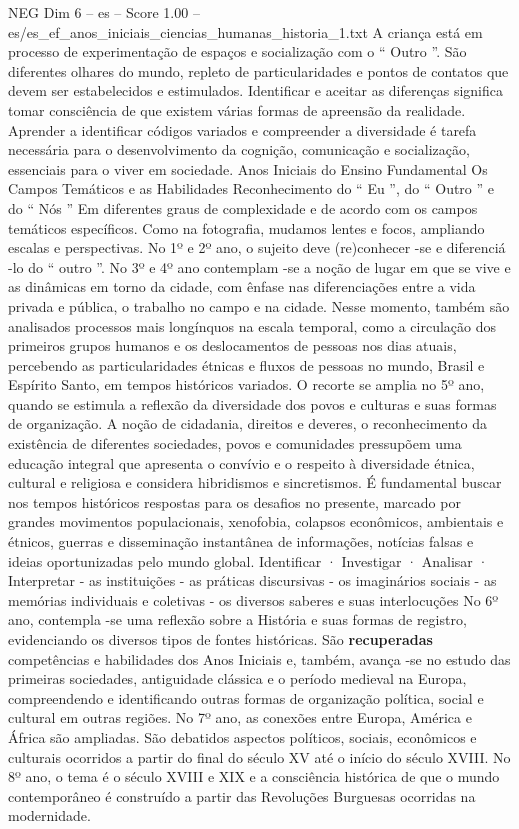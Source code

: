 \begin{textsample}{NEG Dim 6 – es – Score 1.00 – es/es\_ef\_anos\_iniciais\_ciencias\_humanas\_historia\_1.txt}
A criança está em processo de experimentação de espaços e socialização com o “ Outro ”.
São diferentes olhares do mundo, repleto de particularidades e pontos de contatos que devem ser estabelecidos e estimulados.
Identificar e aceitar as diferenças significa tomar consciência de que existem várias formas de apreensão da realidade.
Aprender a identificar códigos variados e compreender a diversidade é tarefa necessária para o desenvolvimento da cognição, comunicação e socialização, essenciais para o viver em sociedade.
Anos Iniciais do Ensino Fundamental Os Campos Temáticos e as Habilidades Reconhecimento do “ Eu ”, do “ Outro ” e do “ Nós ” Em diferentes graus de complexidade e de acordo com os campos temáticos específicos.
Como na fotografia, mudamos lentes e focos, ampliando escalas e perspectivas.
No 1º e 2º ano, o sujeito deve (re)conhecer -se e diferenciá -lo do “ outro ”.
No 3º e 4º ano contemplam -se a noção de lugar em que se vive e as dinâmicas em torno da cidade, com ênfase nas diferenciações entre a vida privada e pública, o trabalho no campo e na cidade.
Nesse momento, também são analisados processos mais longínquos na escala temporal, como a circulação dos primeiros grupos humanos e os deslocamentos de pessoas nos dias atuais, percebendo as particularidades étnicas e fluxos de pessoas no mundo, Brasil e Espírito Santo, em tempos históricos variados.
O recorte se amplia no 5º ano, quando se estimula a reflexão da diversidade dos povos e culturas e suas formas de organização.
A noção de cidadania, direitos e deveres, o reconhecimento da existência de diferentes sociedades, povos e comunidades pressupõem uma educação integral que apresenta o convívio e o respeito à diversidade étnica, cultural e religiosa e considera hibridismos e sincretismos.
É fundamental buscar nos tempos históricos respostas para os desafios no presente, marcado por grandes movimentos populacionais, xenofobia, colapsos econômicos, ambientais e étnicos, guerras e disseminação instantânea de informações, notícias falsas e ideias oportunizadas pelo mundo global.
Identificar · Investigar · Analisar · Interpretar - as instituições - as práticas discursivas - os imaginários sociais - as memórias individuais e coletivas - os diversos saberes e suas interlocuções No 6º ano, contempla -se uma reflexão sobre a História e suas formas de registro, evidenciando os diversos tipos de fontes históricas.
São \textbf{recuperadas} competências e habilidades dos Anos Iniciais e, também, avança -se no estudo das primeiras sociedades, antiguidade clássica e o período medieval na Europa, compreendendo e identificando outras formas de organização política, social e cultural em outras regiões.
No 7º ano, as conexões entre Europa, América e África são ampliadas.
São debatidos aspectos políticos, sociais, econômicos e culturais ocorridos a partir do final do século XV até o início do século XVIII.
No 8º ano, o tema é o século XVIII e XIX e a consciência histórica de que o mundo contemporâneo é construído a partir das Revoluções Burguesas ocorridas na modernidade.

\end{textsample}
